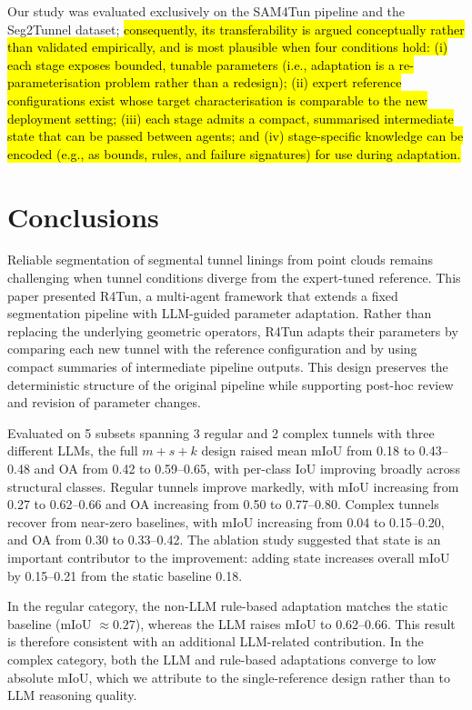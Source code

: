 \documentclass[a4paper,fleqn]{cas-dc}
\begin{document}
{Our study was evaluated exclusively on the SAM4Tun pipeline and the Seg2Tunnel dataset; \hl{consequently, its transferability is argued conceptually rather than validated empirically, and is most plausible when four conditions hold: (i) each stage exposes bounded, tunable parameters (i.e., adaptation is a re-parameterisation problem rather than a redesign); (ii) expert reference configurations exist whose target characterisation is comparable to the new deployment setting; (iii) each stage admits a compact, summarised intermediate state that can be passed between agents; and (iv) stage-specific knowledge can be encoded (e.g., as bounds, rules, and failure signatures) for use during adaptation.} 

\section{Conclusions}\label{sec:conclusions}

Reliable segmentation of segmental tunnel linings from point clouds remains challenging when tunnel conditions diverge from the expert-tuned reference. This paper presented R4Tun, a multi-agent framework that extends a fixed segmentation pipeline with LLM-guided parameter adaptation. Rather than replacing the underlying geometric operators, R4Tun adapts their parameters by comparing each new tunnel with the reference configuration and by using compact summaries of intermediate pipeline outputs. This design preserves the deterministic structure of the original pipeline while supporting post-hoc review and revision of parameter changes.

Evaluated on 5 subsets spanning 3 regular and 2 complex tunnels with three different LLMs, the full \mbox{$m+s+k$} design raised mean mIoU from 0.18 to 0.43--0.48 and OA from 0.42 to 0.59--0.65, with per-class IoU improving broadly across structural classes. Regular tunnels improve markedly, with mIoU increasing from 0.27 to 0.62--0.66 and OA increasing from 0.50 to 0.77--0.80. Complex tunnels recover from near-zero baselines, with mIoU increasing from 0.04 to 0.15--0.20, and OA from 0.30 to 0.33--0.42. The ablation study suggested that state is an important contributor to the improvement: adding state increases overall mIoU by 0.15--0.21 from the static baseline 0.18.

In the regular category, the non-LLM rule-based adaptation matches the static baseline (mIoU $\approx 0.27$), whereas the LLM raises mIoU to 0.62--0.66. This result is therefore consistent with an additional LLM-related contribution. In the complex category, both the LLM and rule-based adaptations converge to low absolute mIoU, which we attribute to the single-reference design rather than to LLM reasoning quality.

}
\end{document}
